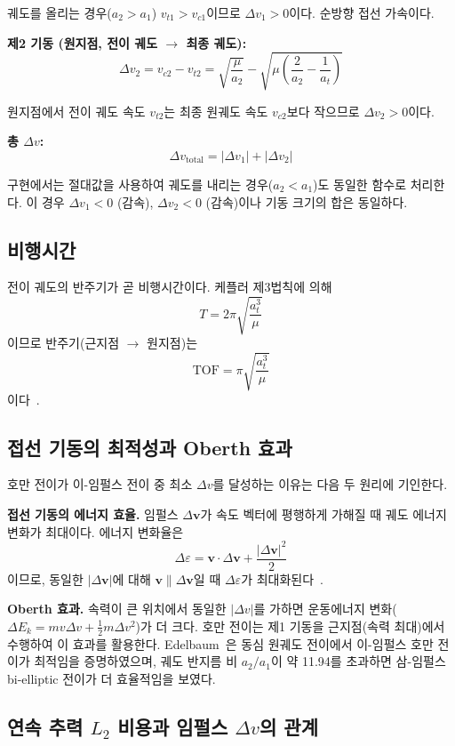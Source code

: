 \documentclass[11pt]{article}
\begin{document}
궤도를 올리는 경우($a_2 > a_1$) $v_{t1} > v_{c1}$이므로 $\Delta v_1 > 0$이다. 순방향 접선 가속이다.

\textbf{제2 기동 (원지점, 전이 궤도 $\rightarrow$ 최종 궤도):}
\[
\Delta v_2 = v_{c2} - v_{t2} = \sqrt{\frac{\mu}{a_2}} - \sqrt{\mu\left(\frac{2}{a_2} - \frac{1}{a_t}\right)}
\]

원지점에서 전이 궤도 속도 $v_{t2}$는 최종 원궤도 속도 $v_{c2}$보다 작으므로 $\Delta v_2 > 0$이다.

\textbf{총 $\Delta v$:}
\[
\Delta v_{\text{total}} = |\Delta v_1| + |\Delta v_2|
\]

구현에서는 절대값을 사용하여 궤도를 내리는 경우($a_2 < a_1$)도 동일한 함수로 처리한다. 이 경우 $\Delta v_1 < 0$ (감속), $\Delta v_2 < 0$ (감속)이나 기동 크기의 합은 동일하다.

\subsection{비행시간}

전이 궤도의 반주기가 곧 비행시간이다. 케플러 제3법칙에 의해
\[
T = 2\pi\sqrt{\frac{a_t^3}{\mu}}
\]
이므로 반주기(근지점 $\rightarrow$ 원지점)는
\[
\text{TOF} = \pi\sqrt{\frac{a_t^3}{\mu}}
\]
이다~\cite{Curtis2020}.

\subsection{접선 기동의 최적성과 Oberth 효과}

호만 전이가 이-임펄스 전이 중 최소 $\Delta v$를 달성하는 이유는 다음 두 원리에 기인한다.

\textbf{접선 기동의 에너지 효율.} 임펄스 $\Delta \mathbf{v}$가 속도 벡터에 평행하게 가해질 때 궤도 에너지 변화가 최대이다. 에너지 변화율은
\[
\Delta \varepsilon = \mathbf{v} \cdot \Delta \mathbf{v} + \frac{|\Delta \mathbf{v}|^2}{2}
\]
이므로, 동일한 $|\Delta \mathbf{v}|$에 대해 $\mathbf{v} \parallel \Delta \mathbf{v}$일 때 $\Delta \varepsilon$가 최대화된다~\cite{Lawden1963}.

\textbf{Oberth 효과.} 속력이 큰 위치에서 동일한 $|\Delta v|$를 가하면 운동에너지 변화($\Delta E_k = mv\Delta v + \frac{1}{2}m\Delta v^2$)가 더 크다. 호만 전이는 제1 기동을 근지점(속력 최대)에서 수행하여 이 효과를 활용한다. Edelbaum~\cite{Edelbaum1967}은 동심 원궤도 전이에서 이-임펄스 호만 전이가 최적임을 증명하였으며, 궤도 반지름 비 $a_2/a_1$이 약 11.94를 초과하면 삼-임펄스 bi-elliptic 전이가 더 효율적임을 보였다.

\subsection{연속 추력 $L_2$ 비용과 임펄스 $\Delta v$의 관계}
\end{document}
